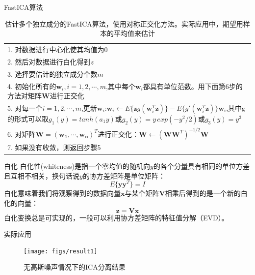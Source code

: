 \documentclass{beamer}
\begin{document}
\begin{frame}{FastICA算法}
\begin{table}[h]
    \centering 
    \begin{tabular}{p{}}
        \hline 
        1. 对数据进行中心化使其均值为0\\
        2. 然后对数据进行白化得到$z$\\
        3. 选择要估计的独立成分个数$m$\\
        4. 初始化所有的$\mathbf{w}_i,i=1,2,\cdots,m$,其中每个$\mathbf{w}_i$都具有单位范数。用下面第6步的方法对矩阵$\mathbf{W}$进行正交化\\
        5. 对每一个$i=1,2,\cdots,m$,更新$\mathbf{w}_i$:$\mathbf{w}_i\leftarrow E\{ \mathbf{z} g(\mathbf{w}_i^T\mathbf{z}) \}-E\{ g'(\mathbf{w}_i^T\mathbf{z}) \}\mathbf{w}_i$,其中g的形式可以取$g_1(y)=tanh(a_1y)$或$g_2(y)=y\,exp(-y^2/2)$或$g_3(y)=y^3$\\
        6. 对矩阵$\mathbf{W}=(\mathbf{w_1},\cdots,\mathbf{w_n})^T$进行正交化：$\mathbf{W}\leftarrow(\mathbf{WW}^T)^{-1/2}\mathbf{W}$\\
        7. 如果没有收敛，则返回步骤5\\
        \hline
    \end{tabular}
    \caption{估计多个独立成分的FastICA算法，使用对称正交化方法。实际应用中，期望用样本的平均值来估计}
    \label{fast_ica_alg}
\end{table}
\end{frame}


\begin{frame}{白化}
    白化性(whiteness)是指一个零均值的随机向$y$的各个分量具有相同的单位方差且互相不相关，换句话说$y$的协方差矩阵是单位矩阵：
    \begin{equation}
    E\{\textbf{yy}^T\}=\mathbf{\mathit{I}}
    \end{equation}
    白化意味着我们将观察得到的数据向量$\mathbf{x}$与某个矩阵$\mathbf{V}$相乘后得到的是一个新的白化的向量：
    \begin{equation}
    \mathbf{z}=\mathbf{Vx}
    \end{equation}
    白化变换总是可实现的，一般可以利用协方差矩阵的特征值分解（EVD）。
\end{frame}

\begin{frame}{实际应用}
\begin{figure}[h]
    \centering
    \texttt{[image: figs/result1]}
    \caption{无高斯噪声情况下的ICA分离结果}
    \label{fig:result1}
\end{figure}
\end{frame}
\end{document}
